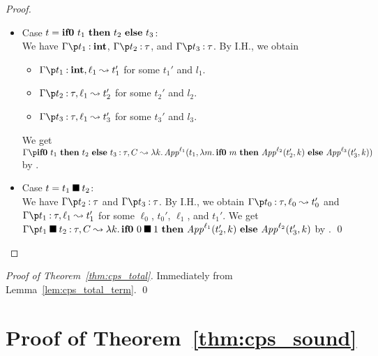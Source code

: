 \begin{proof}
\begin{itemize}
\item Case $t = \mathbf{if0}~{t_1}~\mathbf{then}~{t_2}~\mathbf{else}~{t_3}$: \\
      We have $\Gamma \p t_1 \COL \INT$, $\Gamma \p t_2 \COL \tau$, and $\Gamma \p t_3 \COL \tau$.
      By I.H., we obtain
      \begin{itemize}
       \item $\CPS{\Gamma}{t_1}{\INT}{\ell_1}{t_1'}$ for some $t_1'$ and $l_1$.
       \item $\CPS{\Gamma}{t_2}{\tau}{\ell_1}{t_2'}$ for some $t_2'$ and $l_2$.
       \item $\CPS{\Gamma}{t_3}{\tau}{\ell_1}{t_3'}$ for some $t_3'$ and $l_3$.
      \end{itemize}
      We get $\CPS{\Gamma}{\If{t_1}{t_2}{t_3}}{\tau}{\IC}{}{\Abs{k}{\SApp{\ell_1}{t_1}{\Abs{m}{\If{m}{\SApp{\ell_2}{t_2'}{k}}{\SApp{\ell_3}{t_3'}{k}}}}}}$ by .

\item Case $t = {t_1}\mathbin{\blacksquare}{t_2}$: \\
      We have $\Gamma \p t_2 \COL \tau$ and $\Gamma \p t_3 \COL \tau$.
      By I.H., we obtain $\CPS{\Gamma}{t_0}{\tau}{\ell_0}{t_0'}$ and
      $\CPS{\Gamma}{t_1}{\tau}{\ell_1}{t_1'}$ for some $\ell_0$, $t_0'$, $\ell_1$, and $t_1'$.
      We get $\CPS{\Gamma}{\Br{t_1}{t_2}}{\tau}{\IC}{\Abs{k}{\If{\Br{0}{1}}{\SApp{\ell_1}{t_2'}{k}}{\SApp{\ell_2}{t_3'}{k}}}}$ by . \qed
\end{itemize}
\end{proof}

\begin{proof}[Proof of Theorem~\ref{thm:cps_total}]
Immediately from Lemma~\ref{lem:cps_total_term}.
\qed
\end{proof}


\section{Proof of Theorem~\ref{thm:cps_sound}}



